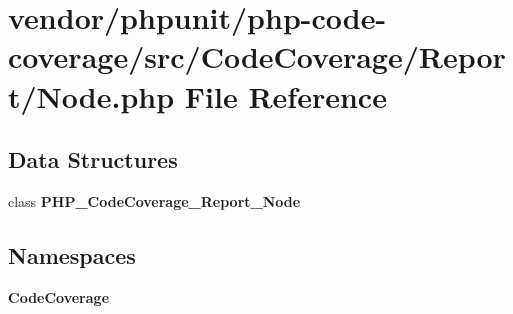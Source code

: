 \section{vendor/phpunit/php-\/code-\/coverage/src/\+Code\+Coverage/\+Report/\+Node.php File Reference}
\label{phpunit_2php-code-coverage_2src_2_code_coverage_2_report_2_node_8php}
\subsection*{Data Structures}
\begin{DoxyCompactItemize}
\item 
class {\bf P\+H\+P\+\_\+\+Code\+Coverage\+\_\+\+Report\+\_\+\+Node}
\end{DoxyCompactItemize}
\subsection*{Namespaces}
\begin{DoxyCompactItemize}
\item 
 {\bf Code\+Coverage}
\end{DoxyCompactItemize}
